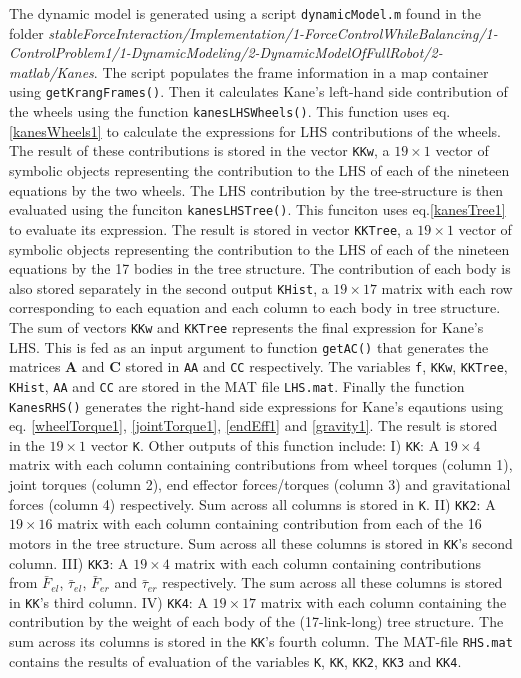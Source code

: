 \documentclass[a4paper,10pt]{article}
\begin{document}
The dynamic model is generated using a script \texttt{dynamicModel.m} found in the folder 
\textit{ stableForceInteraction/Implementation/1-ForceControlWhileBalancing/1-ControlProblem1/1-DynamicModeling/2-DynamicModelOfFullRobot/2-matlab/Kanes}.
The script populates the frame information in a map container using \texttt{getKrangFrames()}. Then it
calculates Kane's left-hand side contribution of the wheels using the function \texttt{kanesLHSWheels()}. This function uses eq.\ref{kanesWheels1} to calculate the expressions for LHS contributions of the wheels. The result of these contributions is stored in the vector \texttt{KKw}, a $19 \times 1$ vector of symbolic objects representing the contribution to the LHS of each of the nineteen equations by the two wheels. The LHS contribution by the tree-structure is then evaluated using the funciton \texttt{kanesLHSTree()}. This funciton uses eq.\ref{kanesTree1} to evaluate its expression. The result is stored in vector \texttt{KKTree}, a $19 \times 1$ vector of symbolic objects representing the contribution to the LHS of each of the nineteen equations by the 17 bodies in the tree structure. The contribution of each body is also stored separately in the second output \texttt{KHist}, a $19 \times 17$ matrix with each row corresponding to each equation and each column to each body in tree structure. The sum of vectors \texttt{KKw} and \texttt{KKTree} represents the final expression for Kane's LHS. This is fed as an input argument to function \texttt{getAC()} that generates the matrices $\mathbf{A}$ and $\mathbf{C}$ stored in \texttt{AA} and \texttt{CC} respectively. The variables \texttt{f}, \texttt{KKw}, \texttt{KKTree}, \texttt{KHist}, \texttt{AA} and \texttt{CC} are stored in the MAT file \texttt{LHS.mat}. Finally the function \texttt{KanesRHS()} generates the right-hand side expressions for Kane's eqautions using eq. \ref{wheelTorque1}, \ref{jointTorque1}, \ref{endEff1} and \ref{gravity1}. The result is stored in the $19 \times 1$ vector \texttt{K}. Other outputs of this function include: I) \texttt{KK}: A $19 \times 4$ matrix with each column containing contributions from wheel torques (column 1), joint torques (column 2), end effector forces/torques (column 3) and gravitational forces (column 4) respectively. Sum across all columns is stored in \texttt{K}. II) \texttt{KK2}: A $19 \times 16$ matrix with each column containing contribution from each of the 16 motors in the tree structure. Sum across all these columns is stored in \texttt{KK}'s second column. III) \texttt{KK3}: A $19 \times 4$ matrix with each column containing contributions from $\bar{F}_{el}$, $\bar{\tau}_{el}$, $\bar{F}_{er}$ and $\bar{\tau}_{er}$ respectively. The sum across all these columns is stored in \texttt{KK}'s third column. IV) \texttt{KK4}: A $19 \times 17$ matrix with each column containing the contribution by the weight of each body of the (17-link-long) tree structure. The sum across its columns is stored in the \texttt{KK}'s fourth column. The MAT-file \texttt{RHS.mat} contains the results of evaluation of the variables \texttt{K}, \texttt{KK}, \texttt{KK2}, \texttt{KK3} and \texttt{KK4}.
\end{document}

